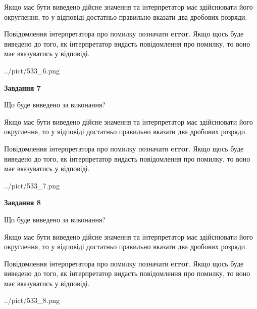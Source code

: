 \documentclass[12pt, ukrainian]{article}
\begin{document}
{\begin {Large}
Якщо має бути виведено дійсне значення та інтерпретатор має здійснювати його округлення, 
то у відповіді достатньо правильно вказати два дробових розряди.

Повідомлення інтерпретатора про помилку позначати \textbf{error}.
Якщо щось буде виведено до того, як інтерпретатор видасть повідомлення про помилку, 
то воно має вказуватись у відповіді. \par

\begin{center}
	{../pict/533_6.png}
\end{center}
\newpage

{\begin {center}\textbf{Завдання 7}\end {center}}\par
Що буде виведено за виконання? \par

Якщо має бути виведено дійсне значення та інтерпретатор має здійснювати його округлення, 
то у відповіді достатньо правильно вказати два дробових розряди.

Повідомлення інтерпретатора про помилку позначати \textbf{error}.
Якщо щось буде виведено до того, як інтерпретатор видасть повідомлення про помилку, 
то воно має вказуватись у відповіді. \par

\begin{center}
	{../pict/533_7.png}
\end{center}
\newpage

{\begin {center}\textbf{Завдання 8}\end {center}}\par
Що буде виведено за виконання? \par

Якщо має бути виведено дійсне значення та інтерпретатор має здійснювати його округлення, 
то у відповіді достатньо правильно вказати два дробових розряди.

Повідомлення інтерпретатора про помилку позначати \textbf{error}.
Якщо щось буде виведено до того, як інтерпретатор видасть повідомлення про помилку, 
то воно має вказуватись у відповіді. \par

\begin{center}
	{../pict/533_8.png}
\end{center}
\newpage


\end{Large}}
\end{document}
